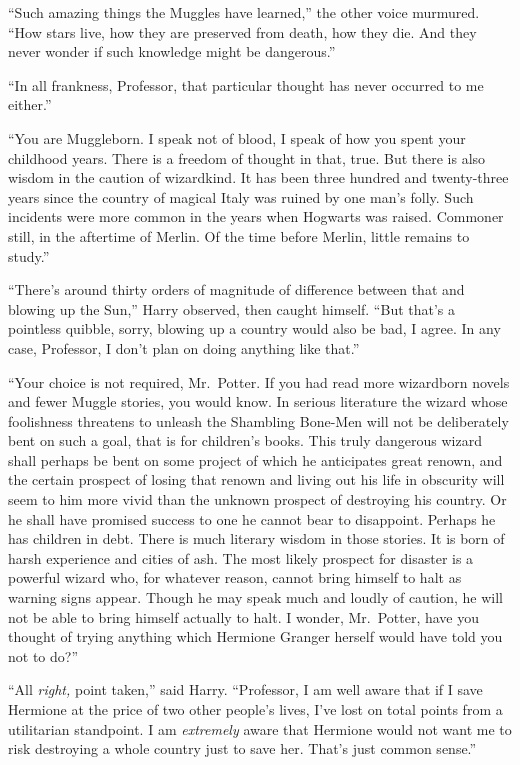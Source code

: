 ``Such amazing things the Muggles have learned,'' the other voice
murmured. ``How stars live, how they are preserved from death, how they
die. And they never wonder if such knowledge might be dangerous.''

``In all frankness, Professor, that particular thought has never
occurred to me either.''

``You are Muggleborn. I speak not of blood, I speak of how you spent
your childhood years. There is a freedom of thought in that, true. But
there is also wisdom in the caution of wizardkind. It has been three
hundred and twenty-three years since the country of magical Italy was
ruined by one man's folly. Such incidents were more common in the years
when Hogwarts was raised. Commoner still, in the aftertime of Merlin. Of
the time before Merlin, little remains to study.''

``There's around thirty orders of magnitude of difference between that
and blowing up the Sun,'' Harry observed, then caught himself. ``But
that's a pointless quibble, sorry, blowing up a country would also be
bad, I agree. In any case, Professor, I don't plan on doing anything
like that.''

``Your choice is not required, Mr.~Potter. If you had read more
wizardborn novels and fewer Muggle stories, you would know. In serious
literature the wizard whose foolishness threatens to unleash the
Shambling Bone-Men will not be deliberately bent on such a goal, that is
for children's books. This truly dangerous wizard shall perhaps be bent
on some project of which he anticipates great renown, and the certain
prospect of losing that renown and living out his life in obscurity will
seem to him more vivid than the unknown prospect of destroying his
country. Or he shall have promised success to one he cannot bear to
disappoint. Perhaps he has children in debt. There is much literary
wisdom in those stories. It is born of harsh experience and cities of
ash. The most likely prospect for disaster is a powerful wizard who, for
whatever reason, cannot bring himself to halt as warning signs appear.
Though he may speak much and loudly of caution, he will not be able to
bring himself actually to halt. I wonder, Mr.~Potter, have you thought
of trying anything which Hermione Granger herself would have told you
not to do?''

``All \emph{right,} point taken,'' said Harry. ``Professor, I am well
aware that if I save Hermione at the price of two other people's lives,
I've lost on total points from a utilitarian standpoint. I am
\emph{extremely} aware that Hermione would not want me to risk
destroying a whole country just to save her. That's just common sense.''

